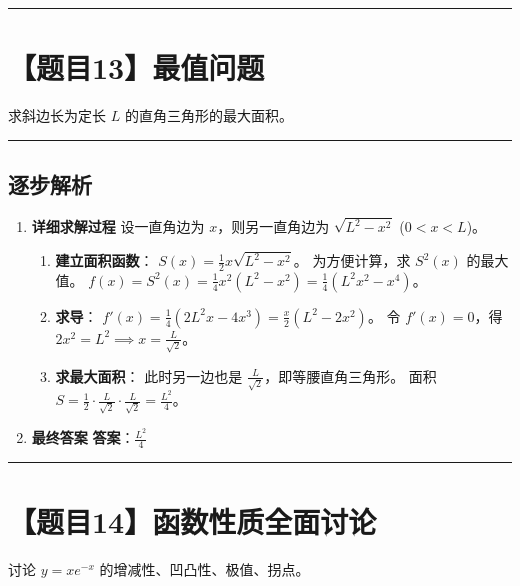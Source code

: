 \documentclass[UTF8]{ctexart}
\newenvironment{redenv}{\color{red}}{}
\newenvironment{detailedanalysis}{%
    \color{red}
    \begin{enumerate}[label=\textbf{第\arabic*步：}, leftmargin=*, align=left, itemsep=1.5ex]
}{%
    \end{enumerate}
}
\newcommand{\problemrule}{\noindent\rule{\textwidth}{1.5pt}\vspace{-0.8em}}
\newcommand{\analysisrule}{\noindent\rule{\textwidth}{0.8pt}\vspace{-0.8em}}
\begin{document}
\problemrule
\section*{【题目13】最值问题}
求斜边长为定长 $L$ 的直角三角形的最大面积。

\begin{redenv}
\analysisrule
\subsection*{逐步解析}

\begin{detailedanalysis}
\item \textbf{详细求解过程}
设一直角边为 $x$，则另一直角边为 $\sqrt{L^2 - x^2}$ ($0 < x < L$)。
\begin{enumerate}[label=(\arabic*)]
\item \textbf{建立面积函数}：
$S(x) = \frac{1}{2} x \sqrt{L^2 - x^2}$。
为方便计算，求 $S^2(x)$ 的最大值。
$f(x) = S^2(x) = \frac{1}{4} x^2 (L^2 - x^2) = \frac{1}{4} (L^2 x^2 - x^4)$。
\item \textbf{求导}：
$f'(x) = \frac{1}{4} (2L^2 x - 4x^3) = \frac{x}{2} (L^2 - 2x^2)$。
令 $f'(x) = 0$，得 $2x^2 = L^2 \implies x = \frac{L}{\sqrt{2}}$。
\item \textbf{求最大面积}：
此时另一边也是 $\frac{L}{\sqrt{2}}$，即等腰直角三角形。
面积 $S = \frac{1}{2} \cdot \frac{L}{\sqrt{2}} \cdot \frac{L}{\sqrt{2}} = \frac{L^2}{4}$。
\end{enumerate}

\item \textbf{最终答案}
\textbf{答案}：$ \frac{L^2}{4} $
\end{detailedanalysis}
\end{redenv}

\problemrule
\section*{【题目14】函数性质全面讨论}
讨论 $ y = xe^{-x} $ 的增减性、凹凸性、极值、拐点。
\end{document}
